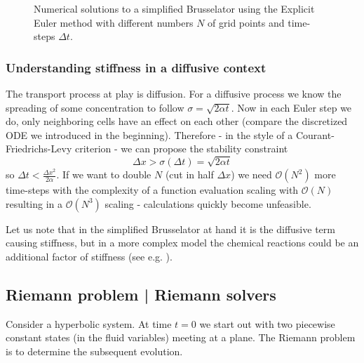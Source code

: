 \begin{figure}
  \centering
  \begin{subfigure}{.5\textwidth}
    \centering
    
    \caption[width=.92\linewidth]{}
    \label{fig:bruss_ex_eu40}
  \end{subfigure}%
  \begin{subfigure}{.5\textwidth}
    \centering
    
    \caption[width=.92\linewidth]{}
    \label{fig:bruss_ex_eu400A}
  \end{subfigure}
  \begin{subfigure}{.5\textwidth}
    \centering
    
    \caption[width=.92\linewidth]{}
    \label{fig:bruss_ex_eu400B}
  \end{subfigure}
  \caption{Numerical solutions to a simplified Brusselator using the Explicit Euler method with different numbers $N$ of grid points and time-steps $\Delta t$.}
  \label{fig:bruss_2d_stab}
\end{figure}

\subsubsection*{Understanding stiffness in a diffusive context}

The transport process at play is diffusion. For a diffusive process we know the spreading of some concentration to follow $\sigma = \sqrt{2\alpha t}$. Now in each Euler step we do, only neighboring cells have an effect on each other (compare the discretized ODE we introduced in the beginning). Therefore - in the style of a Courant-Friedrichs-Levy criterion \citep{Courant1928} - we can propose the stability constraint
$$\Delta x > \sigma(\Delta t) = \sqrt{2\alpha t}$$
so $\Delta t < \frac{\Delta x^2}{2 \alpha}$. If we want to double $N$ (cut in half $\Delta x$) we need $\mathcal O(N^2)$ more time-steps with the complexity of a function evaluation scaling with $\mathcal O(N)$ resulting in a $\mathcal O(N^3)$ scaling - calculations quickly become unfeasible.

Let us note that in the simplified Brusselator at hand it is the diffusive term causing stiffness, but in a more complex model the chemical reactions could be an additional factor of stiffness (see e.g. \cite{chou07}).

\subsection{Riemann problem | Riemann solvers}
Consider a hyperbolic system. At time $t=0$ we start out with two
piecewise constant states (in the fluid variables) meeting at a plane.
The Riemann problem is to determine the subsequent evolution.

